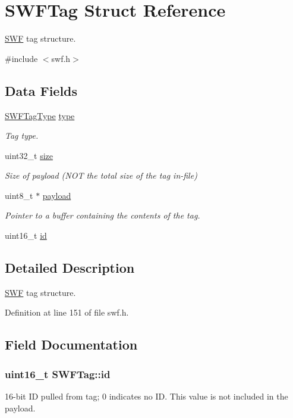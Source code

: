 \hypertarget{struct_s_w_f_tag}{\section{S\-W\-F\-Tag Struct Reference}
\label{struct_s_w_f_tag}
}


\hyperlink{struct_s_w_f}{S\-W\-F} tag structure.  




{\ttfamily \#include $<$swf.\-h$>$}

\subsection*{Data Fields}
\begin{DoxyCompactItemize}
\item 
\hyperlink{swf_8h_a2197ad52b3b2be681014c5c07653c888}{S\-W\-F\-Tag\-Type} \hyperlink{struct_s_w_f_tag_adb10fb48757369896fd9c41e47a59f44}{type}
\begin{DoxyCompactList}\small\item\em Tag type. \end{DoxyCompactList}\item 
uint32\-\_\-t \hyperlink{struct_s_w_f_tag_a17e4a212bb86a411cec95574ec263815}{size}
\begin{DoxyCompactList}\small\item\em Size of payload (N\-O\-T the total size of the tag in-\/file) \end{DoxyCompactList}\item 
uint8\-\_\-t $\ast$ \hyperlink{struct_s_w_f_tag_a71d91ae229304ea8ee7ed56636d3aa18}{payload}
\begin{DoxyCompactList}\small\item\em Pointer to a buffer containing the contents of the tag. \end{DoxyCompactList}\item 
uint16\-\_\-t \hyperlink{struct_s_w_f_tag_a5ea4db43f2f7891bf5dadab7556a9a54}{id}
\end{DoxyCompactItemize}


\subsection{Detailed Description}
\hyperlink{struct_s_w_f}{S\-W\-F} tag structure. 

Definition at line 151 of file swf.\-h.



\subsection{Field Documentation}
\hypertarget{struct_s_w_f_tag_a5ea4db43f2f7891bf5dadab7556a9a54}{
\subsubsection[{id}]{\setlength{\rightskip}{0pt plus 5cm}uint16\-\_\-t S\-W\-F\-Tag\-::id}}\label{struct_s_w_f_tag_a5ea4db43f2f7891bf5dadab7556a9a54}
16-\/bit I\-D pulled from tag; 0 indicates no I\-D. This value is not included in the payload. 

